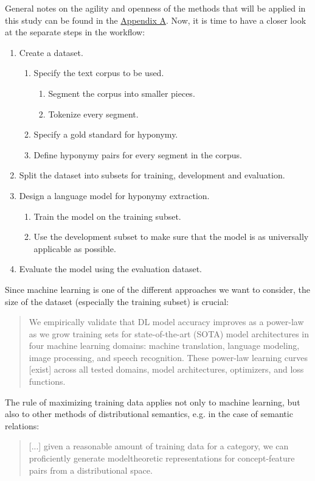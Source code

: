 \documentclass[jou]{apa6} %
\begin{document}
General notes on the agility and openness of the methods that will be applied in this study can be found in the \hyperref[sec:appendixA]{Appendix A}. Now, it is time to have a closer look at the separate steps in the workflow:
\begin{enumerate}
         \item Create a dataset.
         \begin{enumerate}
		\item Specify the text corpus to be used.
		 \begin{enumerate}
			\item Segment the corpus into smaller pieces.
			\item Tokenize every segment.
		\end{enumerate}
		\item Specify a gold standard for hyponymy.
		\item Define hyponymy pairs for every segment in the corpus.
	\end{enumerate}
         \item Split the dataset into subsets for training, development and evaluation.
         \item Design a language model for hyponymy extraction.
         \begin{enumerate}
		\item Train the model on the training subset.
		\item Use the development subset to make sure that the model is as universally applicable as possible.
	\end{enumerate}
         \item Evaluate the model using the evaluation dataset.
\end{enumerate}
Since machine learning is one of the different approaches we want to consider, the size of the dataset (especially the training subset) is crucial:
\blockquote[{\cite[p.~13]{hestnessDeepLearningScaling2017}}]{We empirically validate that DL model accuracy improves as a power-law as we grow training sets for state-of-the-art (SOTA) model architectures in four machine learning domains: machine translation, language modeling, image processing, and speech recognition. These power-law learning curves [exist] across all tested domains, model architectures, optimizers, and loss functions.}
The rule of maximizing training data applies not only to machine learning, but also to other methods of distributional semantics, e.g. in the case of semantic relations:
\blockquote[{\cite[p.~27]{herbelotBuildingSharedWorld2015}}]{[...] given a reasonable amount of training data for a category, we can proficiently generate modeltheoretic representations for concept-feature pairs from a distributional space.}
\end{document}

